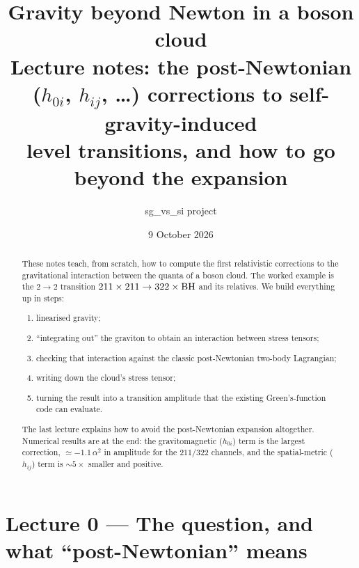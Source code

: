 \documentclass[11pt]{article}
\title{\textbf{Gravity beyond Newton in a boson cloud}\\[4pt]
\large Lecture notes: the post-Newtonian ($h_{0i}$, $h_{ij}$, \dots) corrections to self-gravity-induced\\ level transitions, and how to go beyond the expansion}
\author{sg\_vs\_si project}
\date{9 October 2026}
\begin{document}
\maketitle

\begin{abstract}
These notes teach, from scratch, how to compute the first relativistic corrections to the gravitational interaction between the quanta of a boson cloud. The worked example is the $2\to2$ transition $211\times211\to322\times{\rm BH}$ and its relatives. We build everything up in steps:
\begin{enumerate}[nosep]
\item linearised gravity;
\item ``integrating out'' the graviton to obtain an interaction between stress tensors;
\item checking that interaction against the classic post-Newtonian two-body Lagrangian;
\item writing down the cloud's stress tensor;
\item turning the result into a transition amplitude that the existing Green's-function code can evaluate.
\end{enumerate}
The last lecture explains how to avoid the post-Newtonian expansion altogether. Numerical results are at the end: the gravitomagnetic ($h_{0i}$) term is the largest correction, $\simeq-1.1\,\alpha^2$ in amplitude for the $211/322$ channels, and the spatial-metric ($h_{ij}$) term is $\sim5\times$ smaller and positive.
\end{abstract}

\tableofcontents
\newpage

\section{Lecture 0 --- The question, and what ``post-Newtonian'' means}
\end{document}
